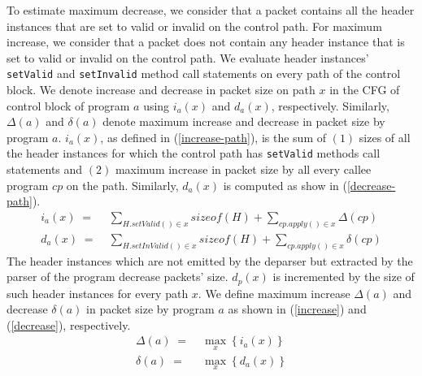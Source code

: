 To estimate maximum decrease, we consider that a packet contains all the header instances that are set to valid or invalid on the control path.
For maximum increase, we consider that a packet does not contain any header instance that is set to valid or invalid on the control path. 
We evaluate header instances' \texttt{setValid} and \texttt{setInvalid} method call statements on every path of the control block.
We denote increase and decrease in packet size on path $x$ in the CFG of control block of program $a$ using $i_{a}(x)$ and $d_{a}(x)$, respectively.
Similarly, $\Delta(a)$ and $\delta(a)$ denote maximum increase and decrease in packet size by program $a$.
$i_{a}(x)$, as defined in (\ref{increase-path}), is the sum of $(1)$ sizes of all the header instances for which the control path has \texttt{setValid} methods call statements and $(2)$ maximum increase in packet size by all every callee program $cp$ on the path.
Similarly, $d_{a}(x)$ is computed as show in (\ref{decrease-path}).
\begin{align}
i_{a}(x)\; =& \; \sum_{H.setValid() \in x} sizeof(H) + \sum_{cp.apply()\in x} \Delta(cp) \label{increase-path} \\
d_{a}(x)\; =& \; \sum_{H.setInValid() \in x} sizeof(H) + \sum_{cp.apply()\in x} \delta(cp) \label{decrease-path}
\end{align}
The header instances which are not emitted by the deparser but extracted by the parser of the program decrease packets' size. 
$d_{p}(x)$ is incremented by the size of such header instances for every path $x$.
We define maximum increase $\Delta(a)$ and decrease $\delta(a)$ in packet size by program $a$ as shown in (\ref{increase}) and (\ref{decrease}), respectively.
\begin{align}
\Delta(a)\; =& \; \max_{x} \left\{ i_{a}(x) \right\} \label{increase} \\
\delta(a)\; =& \; \max_{x} \left\{ d_{a}(x) \right\} \label{decrease}
\end{align}


